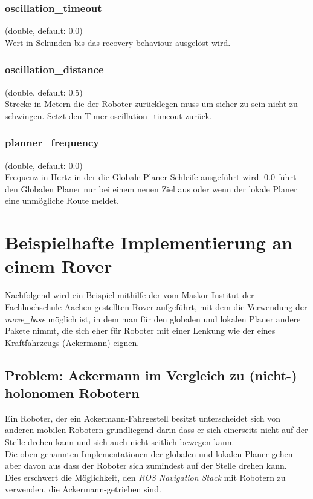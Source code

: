 \documentclass[oribibl]{llncs}
\begin{document}
\subsubsection{oscillation\_timeout} (double, default: 0.0)\\
	Wert in Sekunden bis das recovery behaviour ausgelöst wird.
\subsubsection{oscillation\_distance} (double, default: 0.5)\\
	Strecke in Metern die der Roboter zurücklegen muss um sicher zu sein nicht zu schwingen. Setzt den Timer oscillation\_timeout zurück.
\subsubsection{planner\_frequency} (double, default: 0.0)\\
	Frequenz in Hertz in der die Globale Planer Schleife ausgeführt wird.
	0.0 führt den Globalen Planer nur bei einem neuen Ziel aus oder wenn der lokale Planer eine unmögliche Route meldet.	
\newpage
\section{Beispielhafte Implementierung an einem Rover}
Nachfolgend wird ein Beispiel mithilfe der vom Maskor-Institut der Fachhochschule Aachen gestellten Rover aufgeführt, mit dem die Verwendung der \textit{move\_base} möglich ist, in dem man für den globalen und lokalen Planer andere Pakete nimmt, die sich eher für Roboter mit einer Lenkung wie der eines Kraftfahrzeugs (Ackermann) eignen.\\
\subsection{Problem: Ackermann im Vergleich zu (nicht-) holonomen Robotern}
Ein Roboter, der ein Ackermann-Fahrgestell besitzt unterscheidet sich von anderen mobilen Robotern grundliegend darin dass er sich einerseits nicht auf der Stelle drehen kann und sich auch nicht seitlich bewegen kann.\\
Die oben genannten Implementationen der globalen und lokalen Planer gehen aber davon aus dass der Roboter sich zumindest auf der Stelle drehen kann.\\
Dies erschwert die Möglichkeit, den \textit{ROS Navigation Stack} mit Robotern zu verwenden, die Ackermann-getrieben sind.\cite{ackermannGroup}
\end{document}
